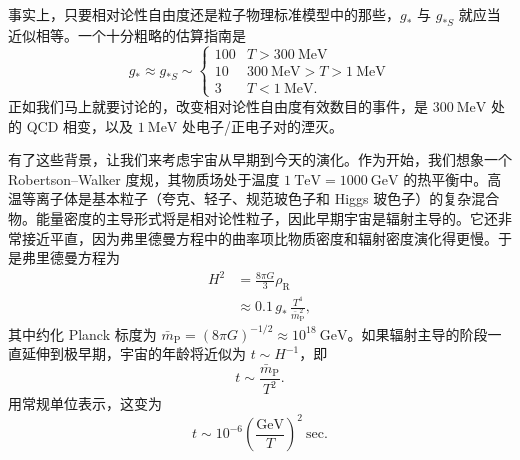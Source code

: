 

事实上，只要相对论性自由度还是粒子物理标准模型中的那些，$g_{*}$ 与 $g_{*S}$ 就应当近似相等。一个十分粗略的估算指南是
\begin{equation*}
g_{*} \approx g_{*S} \sim
\left\{
\begin{array}{ll}
100 & T > 300~\mathrm{MeV} \\
10 & 300~\mathrm{MeV} > T > 1~\mathrm{MeV} \\
3 & T < 1~\mathrm{MeV}.
\end{array}
\right.
\tag{8.176}
\end{equation*}
正如我们马上就要讨论的，改变相对论性自由度有效数目的事件，是 $300~\mathrm{MeV}$ 处的 QCD 相变，以及 $1~\mathrm{MeV}$ 处电子/正电子对的湮灭。

有了这些背景，让我们来考虑宇宙从早期到今天的演化。作为开始，我们想象一个 Robertson--Walker 度规，其物质场处于温度 $1~\mathrm{TeV}=1000~\mathrm{GeV}$ 的热平衡中。高温等离子体是基本粒子（夸克、轻子、规范玻色子和 Higgs 玻色子）的复杂混合物。能量密度的主导形式将是相对论性粒子，因此早期宇宙是辐射主导的。它还非常接近平直，因为弗里德曼方程中的曲率项比物质密度和辐射密度演化得更慢。于是弗里德曼方程为
\begin{equation*}
\begin{aligned}
H^{2} &= \frac{8\pi G}{3}\rho_{\mathrm{R}} \\
&\approx 0.1\,g_{*}\,\frac{T^{4}}{\bar{m}_{\mathrm{P}}^{2}},
\end{aligned}
\tag{8.177}
\end{equation*}
其中约化 Planck 标度为 $\bar{m}_{\mathrm{P}}=(8\pi G)^{-1/2}\approx 10^{18}~\mathrm{GeV}$。如果辐射主导的阶段一直延伸到极早期，宇宙的年龄将近似为 $t\sim H^{-1}$，即
\begin{equation*}
t \sim \frac{\bar{m}_{\mathrm{P}}}{T^{2}}.
\tag{8.178}
\end{equation*}
用常规单位表示，这变为
\begin{equation*}
t \sim 10^{-6}\left(\frac{\mathrm{GeV}}{T}\right)^{2}~\mathrm{sec}.
\tag{8.179}
\end{equation*}

